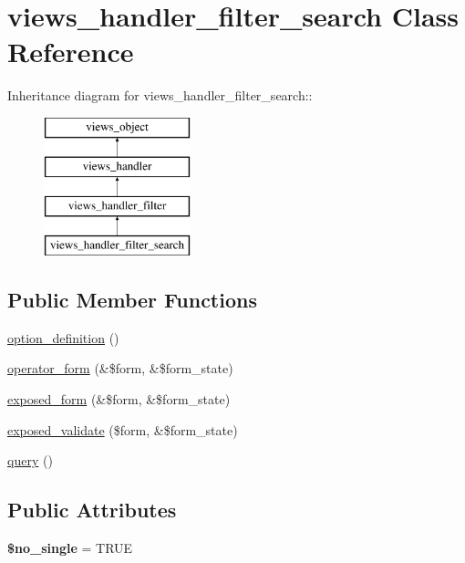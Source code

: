 \hypertarget{classviews__handler__filter__search}{
\section{views\_\-handler\_\-filter\_\-search Class Reference}
\label{classviews__handler__filter__search}
}
Inheritance diagram for views\_\-handler\_\-filter\_\-search::\begin{figure}[H]
\begin{center}
\leavevmode
\includegraphics[height=4cm]{classviews__handler__filter__search}
\end{center}
\end{figure}
\subsection*{Public Member Functions}
\begin{CompactItemize}
\item 
\hyperlink{classviews__handler__filter__search_f41b61b9dc7a676fbe0110c1d7ffcfdb}{option\_\-definition} ()
\item 
\hyperlink{classviews__handler__filter__search_126abdcf04c59fd3e4be404ffd9969cf}{operator\_\-form} (\&\$form, \&\$form\_\-state)
\item 
\hyperlink{classviews__handler__filter__search_fc00db448aa56fcd91e9ab0dbbe7d1ac}{exposed\_\-form} (\&\$form, \&\$form\_\-state)
\item 
\hyperlink{classviews__handler__filter__search_e21a8ecf09164260d7f2f051b9dc28a6}{exposed\_\-validate} (\$form, \&\$form\_\-state)
\item 
\hyperlink{classviews__handler__filter__search_f972f15bdc716b36d04d9a9d4f20b6f5}{query} ()
\end{CompactItemize}
\subsection*{Public Attributes}
\begin{CompactItemize}
\item 
\hypertarget{classviews__handler__filter__search_e8c1d8b3e9984b4e2e23dad6e762544a}{
\textbf{\$no\_\-single} = TRUE}
\label{classviews__handler__filter__search_e8c1d8b3e9984b4e2e23dad6e762544a}

\end{CompactItemize}



